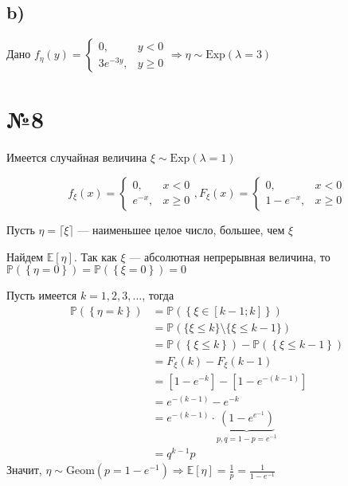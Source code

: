\documentclass[a4paper, 10pt]{article}
\newcommand{\prob}[1]{\mathbb{P}\left(\left\{#1\right\}\right)}
\newcommand{\matwait}[1]{\mathbb{E}\left[#1\right]}
\begin{document}
\subsection*{b)}
Дано $f_{\eta}(y)=\begin{cases}
    0,&y<0\\
    3e^{-3y},&y\geqslant 0
\end{cases}\Longrightarrow \eta\sim \text{Exp}(\lambda=3)$

\section*{№8}
Имеется случайная величина $\xi\sim\text{Exp}(\lambda=1)$

\begin{equation*}
    f_{\xi}(x)=\begin{cases}
    0,&x<0\\
    e^{-x},&x\geqslant 0
\end{cases}, F_{\xi}(x)=\begin{cases}
    0,&x<0\\
    1-e^{-x},&x\geqslant0
\end{cases}
\end{equation*}

\ex Пусть $\eta=\lceil\xi\rceil$ — наименьшее целое число, большее, чем $\xi$

Найдем $\matwait{\eta}$. Так как $\xi$ — абсолютная непрерывная величина, то $\prob{\eta=0}=\prob{\xi=0}=0$

Пусть имеется $k=1,2,3,\ldots$, тогда 
\begin{equation*}
    \begin{aligned}
        \prob{\eta=k}&=\prob{\xi\in[k-1;k]}\\
        &=\mathbb{P}(\{\xi\leqslant k\}\setminus\{\xi\leqslant k-1\})\\
        &=\prob{\xi\leqslant k}-\prob{\xi\leqslant k-1}\\
        &=F_{\xi}(k)-F_{\xi}(k-1)\\
        &=\left[1-e^{-k}\right]-\left[1-e^{-(k-1)}\right]\\
        &=e^{-(k-1)}-e^{-k}\\
        &=e^{-(k-1)}\cdot\underbrace{(1-e^{e^{-1}})}_{p,q=1-p=e^{-1}}\\
        &=q^{k-1}p
    \end{aligned}
\end{equation*}
Значит, $\eta\sim \text{Geom}(p=1-e^{-1})\Longrightarrow\matwait{\eta}=\displaystyle\frac{1}{p}=\frac{1}{1-e^{-1}}$
\end{document}
